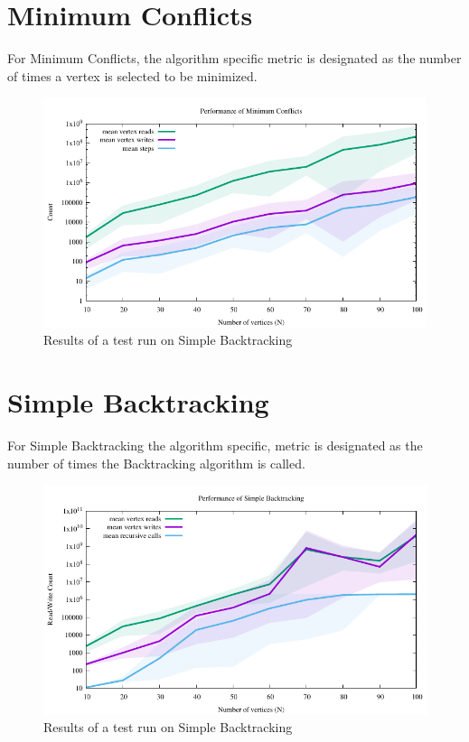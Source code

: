 \documentclass{article}
\begin{document}
\begin{multicols}{2}
\section{Minimum Conflicts}
For Minimum Conflicts, the algorithm specific metric is designated as the number of times a vertex is selected to be minimized.
\begin{figure}[H]
	\centering
	\includegraphics[width=\linewidth]{../results/min_conflicts/min_conflicts_performance}
	\caption{Results of a test run on Simple Backtracking }
\end{figure}

\section{Simple Backtracking}
For Simple Backtracking the algorithm specific, metric is designated as the number of times the Backtracking algorithm is called.
\begin{figure}[H]
	\centering
	\includegraphics[width=\linewidth]{../results/backtracking_simple/bt_simple_performance}
	\caption{Results of a test run on Simple Backtracking }
\end{figure}



\end{multicols}
\end{document}
